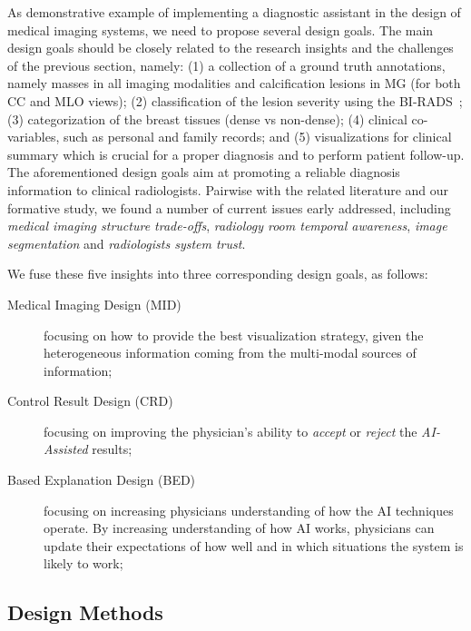 As demonstrative example of implementing a diagnostic assistant in the design of medical imaging systems, we need to propose several design goals.
The main design goals should be closely related to the research insights and the challenges of the previous section, namely:
(1) a collection of a ground truth annotations, namely masses in all imaging modalities and calcification lesions in MG (for both CC and MLO views);
(2) classification of the lesion severity using the BI-RADS~\cite{aghaei2018association};
(3) categorization of the breast tissues (dense vs non-dense);
(4) clinical co-variables, such as personal and family records; and
(5) visualizations for clinical summary which is crucial for a proper diagnosis and to perform patient follow-up.
The aforementioned design goals aim at promoting a reliable diagnosis information to clinical radiologists.
Pairwise with the related literature and our formative study, we found a number of current issues early addressed, including {\it medical imaging structure trade-offs}, {\it radiology room temporal awareness}, {\it image segmentation} and {\it radiologists system trust}.

\noindent
We fuse these five insights into three corresponding design goals, as follows:

\begin{description}
\item[Medical Imaging Design (MID)] focusing on how to provide the best visualization strategy, given the heterogeneous information coming from the multi-modal sources of information;

\item[Control Result Design (CRD)] focusing on improving the physician's ability to {\it accept} or {\it reject} the {\it AI-Assisted} results;

\item[Based Explanation Design (BED)] focusing on increasing physicians understanding of how the AI techniques operate. By increasing understanding of how AI works, physicians can update their expectations of how well and in which situations the system is likely to work;
\end{description}

\subsection{Design Methods}
\label{sec:sec00304}

